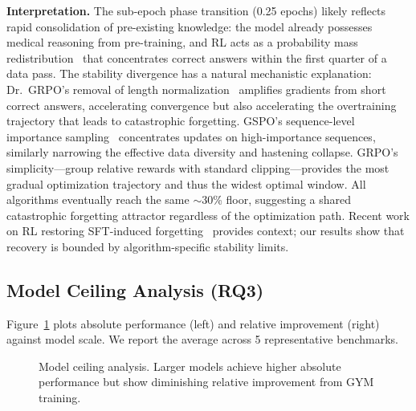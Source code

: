 \documentclass{article}
\begin{document}
\textbf{Interpretation.} The sub-epoch phase transition (0.25 epochs) likely reflects rapid consolidation of pre-existing knowledge: the model already possesses medical reasoning from pre-training, and RL acts as a probability mass redistribution~\citep{yue2025rlvr} that concentrates correct answers within the first quarter of a data pass. The stability divergence has a natural mechanistic explanation: Dr.~GRPO's removal of length normalization~\citep{liu2025drgrpo} amplifies gradients from short correct answers, accelerating convergence but also accelerating the overtraining trajectory that leads to catastrophic forgetting. GSPO's sequence-level importance sampling~\citep{gspo2025} concentrates updates on high-importance sequences, similarly narrowing the effective data diversity and hastening collapse. GRPO's simplicity---group relative rewards with standard clipping---provides the most gradual optimization trajectory and thus the widest optimal window. All algorithms eventually reach the same ${\sim}$30\% floor, suggesting a shared catastrophic forgetting attractor regardless of the optimization path. Recent work on RL restoring SFT-induced forgetting~\citep{jin2025rlheals, chu2025sftrl, song2025rlpanacea} provides context; our results show that recovery is bounded by algorithm-specific stability limits.

\subsection{Model Ceiling Analysis (RQ3)}

Figure~\ref{fig:ceiling} plots absolute performance (left) and relative improvement (right) against model scale. We report the average across 5 representative benchmarks.

\begin{figure}[t]
\centering
\caption{Model ceiling analysis. Larger models achieve higher absolute performance but show diminishing relative improvement from GYM training.}
\label{fig:ceiling}
\end{figure}
\end{document}
